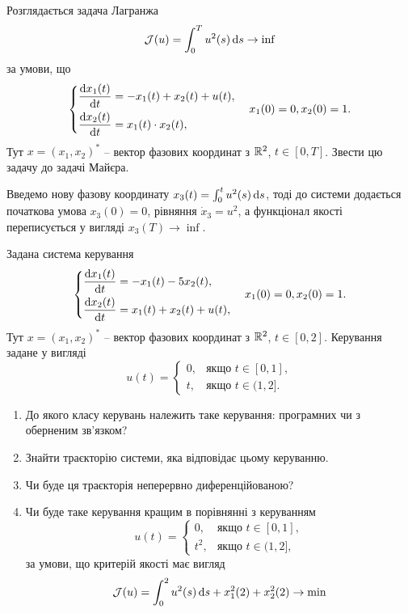 \begin{problem}
	Розглядається задача Лагранжа
		\[
		\mathcal{J}(u)
		=
		\int_0^T u^2(s) \mathop{}\!\mathrm{d} s \to \inf
		\]
		за умови, що
		\[
			\left\{
				\begin{aligned}
					\dfrac{\mathop{}\!\mathrm{d} x_1(t)}{\mathop{}\!\mathrm{d} t} &= -x_1(t) + x_2(t) + u(t), \\
					\dfrac{\mathop{}\!\mathrm{d} x_2(t)}{\mathop{}\!\mathrm{d} t} &= x_1(t) \cdot x_2(t),
				\end{aligned}
			\right.
			\quad
			x_1(0)=0, x_2(0)=1.
		\]
		Тут $x=(x_1,x_2)^*$ -- вектор фазових координат з $\mathbb{R}^2$, $t\in[0,T]$. Звести цю задачу до задачі Майєра.
\end{problem}

\begin{solution}
	Введемо нову фазову координату $x_3(t)=\int_0^t u^2(s) \mathop{}\!\mathrm{d} s$, тоді до системи додається початкова умова $x_3(0)=0$, рівняння $\dot x_3 = u^2$, а функціонал якості переписується у вигляді $x_3(T) \to \inf$.
\end{solution}


\begin{problem}
	Задана система керування \[ \left\{ \begin{aligned}
		\frac{\mathop{}\!\mathrm{d} x_1 (t)}{\mathop{}\!\mathrm{d} t} &= - x_1 (t) - 5 x_2 (t), \\
		\frac{\mathop{}\!\mathrm{d} x_2 (t)}{\mathop{}\!\mathrm{d} t} &= x_1 (t) + x_2 (t) + u(t),
	\end{aligned} \right. 
	\quad x_1 (0) = 0, x_2 (0) = 1. \]
	Тут $x = (x_1, x_2)^*$ -- вектор фазових координат з $\mathbb{R}^2$, $t \in [0, 2]$. Керування задане у вигляді \[ u(t) = \begin{cases} 0, & \text{якщо } t \in [0, 1], \\ t, & \text{якщо } t \in (1, 2]. \end{cases} \]
	\begin{enumerate}
		\item До якого класу керувань належить таке керування: програмних чи з оберненим зв'язком?

		\item Знайти траєкторію системи, яка відповідає цьому керуванню.

		\item Чи буде ця траєкторія неперервно диференційованою?

		\item Чи буде таке керування кращим в порівнянні з керуванням \[ u(t) = \begin{cases} 0, & \text{якщо } t \in [0, 1], \\ t^2, & \text{якщо } t \in (1, 2], \end{cases} \] за умови, що критерій якості має вигляд \[ \mathcal{J} (u) = \int_0^2 u^2(s) \mathop{}\!\mathrm{d} s + x_1^2 (2) + x_2^2 (2) \to \min \]
	\end{enumerate}
\end{problem}

